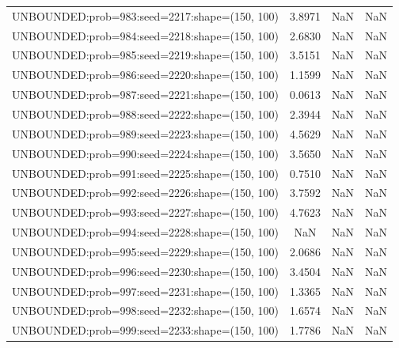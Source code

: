 \begin{longtable}{lccc}
UNBOUNDED:prob=983:seed=2217:shape=(150, 100) &  3.8971 &   NaN &    NaN \\
UNBOUNDED:prob=984:seed=2218:shape=(150, 100) &  2.6830 &   NaN &    NaN \\
UNBOUNDED:prob=985:seed=2219:shape=(150, 100) &  3.5151 &   NaN &    NaN \\
UNBOUNDED:prob=986:seed=2220:shape=(150, 100) &  1.1599 &   NaN &    NaN \\
UNBOUNDED:prob=987:seed=2221:shape=(150, 100) &  0.0613 &   NaN &    NaN \\
UNBOUNDED:prob=988:seed=2222:shape=(150, 100) &  2.3944 &   NaN &    NaN \\
UNBOUNDED:prob=989:seed=2223:shape=(150, 100) &  4.5629 &   NaN &    NaN \\
UNBOUNDED:prob=990:seed=2224:shape=(150, 100) &  3.5650 &   NaN &    NaN \\
UNBOUNDED:prob=991:seed=2225:shape=(150, 100) &  0.7510 &   NaN &    NaN \\
UNBOUNDED:prob=992:seed=2226:shape=(150, 100) &  3.7592 &   NaN &    NaN \\
UNBOUNDED:prob=993:seed=2227:shape=(150, 100) &  4.7623 &   NaN &    NaN \\
UNBOUNDED:prob=994:seed=2228:shape=(150, 100) &     NaN &   NaN &    NaN \\
UNBOUNDED:prob=995:seed=2229:shape=(150, 100) &  2.0686 &   NaN &    NaN \\
UNBOUNDED:prob=996:seed=2230:shape=(150, 100) &  3.4504 &   NaN &    NaN \\
UNBOUNDED:prob=997:seed=2231:shape=(150, 100) &  1.3365 &   NaN &    NaN \\
UNBOUNDED:prob=998:seed=2232:shape=(150, 100) &  1.6574 &   NaN &    NaN \\
UNBOUNDED:prob=999:seed=2233:shape=(150, 100) &  1.7786 &   NaN &    NaN \\
\end{longtable}
